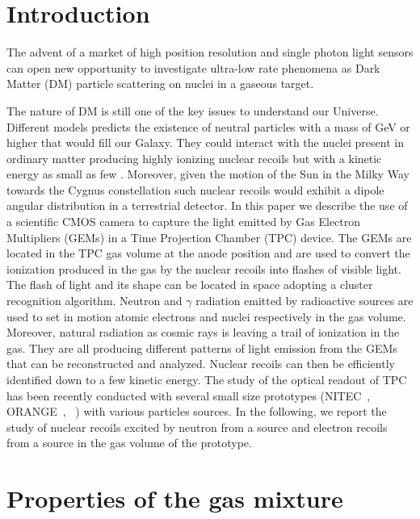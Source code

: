 \documentclass[12pt]{iopart}
\begin{document}
\section{Introduction}

The advent of a market of high position resolution and single photon  light sensors can open new opportunity to investigate ultra-low rate phenomena as Dark Matter  (DM) particle  scattering on nuclei in a gaseous  target.

The nature of DM is still one of the key  issues to understand  our Universe. Different models  predicts the existence of neutral particles with a mass of GeV  or higher that would fill our Galaxy. They  could interact with the nuclei present in ordinary matter producing highly ionizing nuclear recoils but with a  kinetic energy as small as  few \keV. Moreover, given the motion of the Sun in the Milky Way towards the Cygnus constellation such nuclear recoils would exhibit a dipole angular distribution in a terrestrial detector.
In this paper we describe the use of a scientific CMOS camera to capture the light emitted by Gas Electron Multipliers (GEMs) in a Time Projection Chamber (TPC) device. The GEMs are located in the TPC gas volume at the anode position and are used to convert the ionization produced in the gas by   the  nuclear recoils into flashes of visible light. The flash of light and its shape  can be located in space adopting a cluster  recognition algorithm. Neutron and  $\gamma$ radiation emitted by radioactive sources are used to  set in motion  atomic electrons and nuclei respectively in the gas volume. Moreover, natural radiation as cosmic rays is leaving a trail of ionization in the gas. They are all producing different  patterns of light emission from the GEMs that can be reconstructed and analyzed. Nuclear recoils can then be efficiently identified down to a few \keV kinetic energy. 
 The study of the optical readout of TPC has been recently conducted with several small size prototypes (NITEC~\cite{JINST:nitec}, ORANGE~\cite{NIM:Marafinietal, bib:jinst_orange2}, \lemon~\cite{bib:eps, bib:ieee17, bib:elba}) with various particles sources. In the following, we report the study of nuclear recoils excited by neutron from a  \ambe source and electron recoils from a \fe source in the gas volume of the  \lemon prototype.

\section{Properties of the gas mixture}
\end{document}
